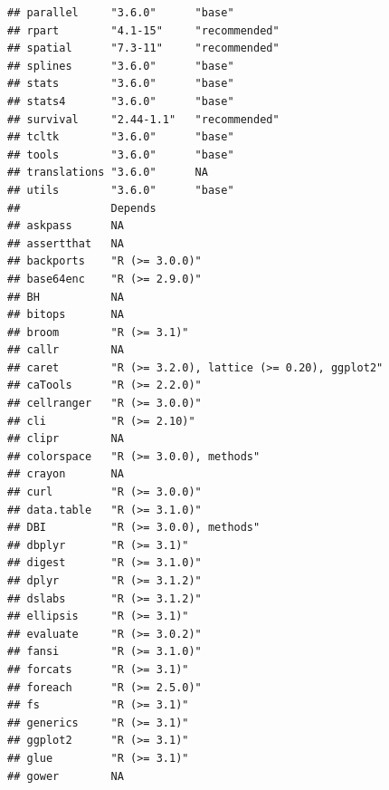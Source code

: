 \documentclass[]{article}
\begin{document}
\begin{verbatim}
## parallel     "3.6.0"      "base"       
## rpart        "4.1-15"     "recommended"
## spatial      "7.3-11"     "recommended"
## splines      "3.6.0"      "base"       
## stats        "3.6.0"      "base"       
## stats4       "3.6.0"      "base"       
## survival     "2.44-1.1"   "recommended"
## tcltk        "3.6.0"      "base"       
## tools        "3.6.0"      "base"       
## translations "3.6.0"      NA           
## utils        "3.6.0"      "base"       
##              Depends                                          
## askpass      NA                                               
## assertthat   NA                                               
## backports    "R (>= 3.0.0)"                                   
## base64enc    "R (>= 2.9.0)"                                   
## BH           NA                                               
## bitops       NA                                               
## broom        "R (>= 3.1)"                                     
## callr        NA                                               
## caret        "R (>= 3.2.0), lattice (>= 0.20), ggplot2"       
## caTools      "R (>= 2.2.0)"                                   
## cellranger   "R (>= 3.0.0)"                                   
## cli          "R (>= 2.10)"                                    
## clipr        NA                                               
## colorspace   "R (>= 3.0.0), methods"                          
## crayon       NA                                               
## curl         "R (>= 3.0.0)"                                   
## data.table   "R (>= 3.1.0)"                                   
## DBI          "R (>= 3.0.0), methods"                          
## dbplyr       "R (>= 3.1)"                                     
## digest       "R (>= 3.1.0)"                                   
## dplyr        "R (>= 3.1.2)"                                   
## dslabs       "R (>= 3.1.2)"                                   
## ellipsis     "R (>= 3.1)"                                     
## evaluate     "R (>= 3.0.2)"                                   
## fansi        "R (>= 3.1.0)"                                   
## forcats      "R (>= 3.1)"                                     
## foreach      "R (>= 2.5.0)"                                   
## fs           "R (>= 3.1)"                                     
## generics     "R (>= 3.1)"                                     
## ggplot2      "R (>= 3.1)"                                     
## glue         "R (>= 3.1)"                                     
## gower        NA                                               

\end{verbatim}
\end{document}
